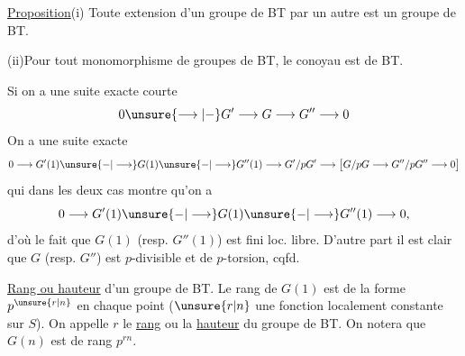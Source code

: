 
\uline{Proposition}\quad (i) Toute extension d'un groupe de BT par un autre est un groupe de BT.

(ii)\quad Pour tout monomorphisme de groupes de BT, le conoyau est de BT.


 Si on a une suite exacte courte
\[
0\unsure{\longrightarrow|-}G'\longrightarrow G\longrightarrow G''\longrightarrow0
\]
 On a une suite exacte
\[
0\longrightarrow G'(1)\unsure{-|\longrightarrow}G(1)\unsure{-|\longrightarrow}G''(1)\longrightarrow G'/pG'
\longrightarrow\bigl[G/pG\longrightarrow G''/pG''\longrightarrow0\bigr]
\]
qui dans les deux cas  montre qu'on a
\[
0\longrightarrow G'(1)\unsure{-|\longrightarrow}G(1)\unsure{-|\longrightarrow}G''(1)\longrightarrow0,
\]
d'où le fait que $G(1)$ (resp. $G''(1)$) est fini loc. libre. D'autre part il est clair que $G$ (resp. $G''$) est $p$-divisible et de $p$-torsion, cqfd.

\uline{Rang ou hauteur} d'un groupe de BT. Le rang de $G(1)$ est de la forme $p^{\unsure{r|n}}$ en chaque point ($\unsure{r|n}$ une fonction localement constante sur $S$). On appelle $r$ le \uline{rang} ou la \uline{hauteur} du groupe de BT. On notera que $G(n)$ est de rang $p^{rn}$.
